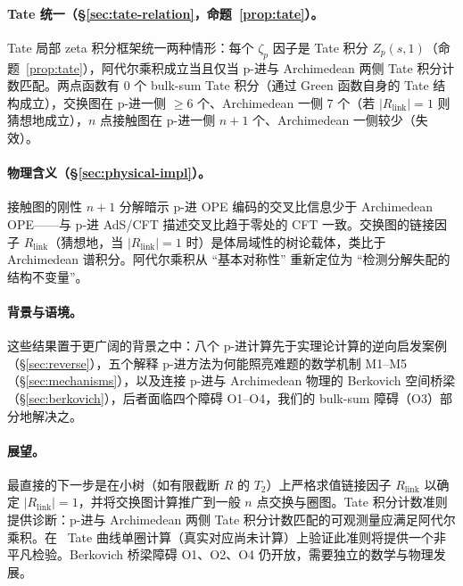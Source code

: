 \documentclass[11pt,a4paper]{ctexart}
\theoremstyle{remark}
\begin{document}
\paragraph{Tate 统一（\S\ref{sec:tate-relation}，命题~\ref{prop:tate}）。}
Tate 局部 zeta 积分框架统一两种情形：每个 $\zeta_p$ 因子是 Tate 积分 $Z_p(s, 1)$（命题~\ref{prop:tate}），阿代尔乘积成立当且仅当 p-进与 Archimedean 两侧 Tate 积分计数匹配。两点函数有 0 个 bulk-sum Tate 积分（通过 Green 函数自身的 Tate 结构成立），交换图在 p-进一侧 $\geq 6$ 个、Archimedean 一侧 7 个（若 $|R_{\mathrm{link}}| = 1$ 则猜想地成立），$n$ 点接触图在 p-进一侧 $n{+}1$ 个、Archimedean 一侧较少（失效）。

\paragraph{物理含义（\S\ref{sec:physical-impl}）。}
接触图的刚性 $n{+}1$ 分解暗示 p-进 OPE 编码的交叉比信息少于 Archimedean OPE——与 p-进 AdS/CFT 描述交叉比趋于零处的 CFT 一致。交换图的链接因子 $R_{\mathrm{link}}$（猜想地，当 $|R_{\mathrm{link}}| = 1$ 时）是体局域性的树论载体，类比于 Archimedean 谱积分。阿代尔乘积从 ``基本对称性'' 重新定位为 ``检测分解失配的结构不变量''。

\paragraph{背景与语境。}
这些结果置于更广阔的背景之中：八个 p-进计算先于实理论计算的逆向启发案例（\S\ref{sec:reverse}），五个解释 p-进方法为何能照亮难题的数学机制 M1--M5（\S\ref{sec:mechanisms}），以及连接 p-进与 Archimedean 物理的 Berkovich 空间桥梁（\S\ref{sec:berkovich}），后者面临四个障碍 O1--O4，我们的 bulk-sum 障碍（O3）部分地解决之。

\paragraph{展望。}
最直接的下一步是在小树（如有限截断 $R$ 的 $T_2$）上严格求值链接因子 $R_{\mathrm{link}}$ 以确定 $|R_{\mathrm{link}}| = 1$，并将交换图计算推广到一般 $n$ 点交换与圈图。Tate 积分计数准则提供诊断：p-进与 Archimedean 两侧 Tate 积分计数匹配的可观测量应满足阿代尔乘积。在~\cite{HJ24} Tate 曲线单圈计算（真实对应尚未计算）上验证此准则将提供一个非平凡检验。Berkovich 桥梁障碍 O1、O2、O4 仍开放，需要独立的数学与物理发展。

\appendix
\end{document}
